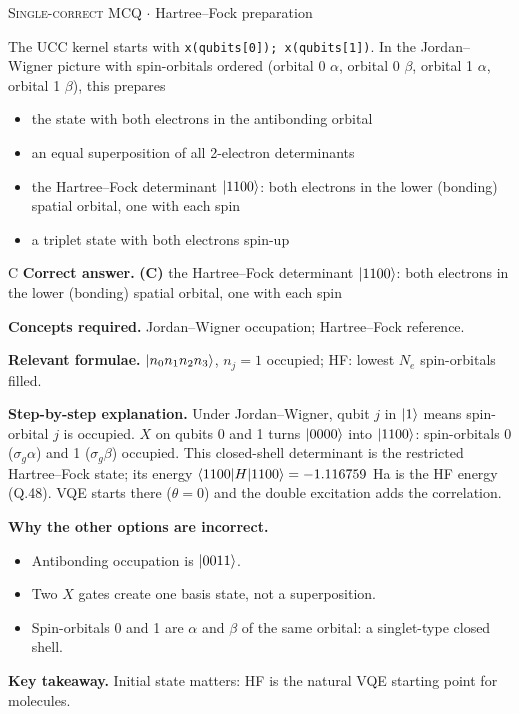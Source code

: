 \documentclass[11pt,a4paper]{article}
\newcommand{\optlabel}[1]{\textbf{(#1)}}
\newcommand{\correctlabel}[1]{\textcolor{okgreen}{\textbf{(#1)}\,\ding{51}}}
\newenvironment{qitem}[1]{\begin{list}{}{\setlength{\leftmargin}{3.3em}\setlength{\labelwidth}{3.1em}%
  \setlength{\labelsep}{0.2em}\setlength{\topsep}{3pt}\setlength{\parsep}{3pt}}\item[\textbf{Q.#1}\hfill]}{\end{list}}
\newcommand{\qsep}{\par\vspace{2pt}{\color{black!15}\hrule}\vspace{4pt}}
\newcommand{\qmeta}[2]{{\footnotesize\color{black!60}\textsc{#1} \;$\cdot$\; #2}\par}
\begin{document}
\begin{qitem}{44}
\qmeta{Single-correct MCQ}{Hartree--Fock preparation}
The UCC kernel starts with \texttt{x(qubits[0]); x(qubits[1])}. In the Jordan--Wigner picture with spin-orbitals ordered (orbital 0 $\alpha$, orbital 0 $\beta$,
orbital 1 $\alpha$, orbital 1 $\beta$), this prepares
\begin{itemize}[leftmargin=2.6em, labelsep=0.4em, itemsep=2pt, topsep=3pt]
\item[\optlabel{A}] the state with both electrons in the antibonding orbital
\item[\optlabel{B}] an equal superposition of all 2-electron determinants
\item[\correctlabel{C}] the Hartree--Fock determinant $\ket{1100}$: both electrons in the lower (bonding) spatial orbital, one with each spin
\item[\optlabel{D}] a triplet state with both electrons spin-up
\end{itemize}
\end{qitem}
\begin{solbox}{C}
\textbf{\color{brand}Correct answer.} \textcolor{okgreen}{\textbf{(C)}} the Hartree--Fock determinant $\ket{1100}$: both electrons in the lower (bonding) spatial orbital, one with each spin

\textbf{\color{brand}Concepts required.} Jordan--Wigner occupation; Hartree--Fock reference.

\textbf{\color{brand}Relevant formulae.} $\ket{n_0n_1n_2n_3}$, $n_j = 1$ occupied; HF: lowest $N_e$ spin-orbitals filled.

\textbf{\color{brand}Step-by-step explanation.} Under Jordan--Wigner, qubit $j$ in $\ket1$ means spin-orbital $j$ is occupied. $X$ on qubits 0 and 1 turns $\ket{0000}$ into $\ket{1100}$: spin-orbitals
0 ($\sigma_g\alpha$) and 1 ($\sigma_g\beta$) occupied. This closed-shell determinant is the restricted Hartree--Fock state; its energy
$\braket{1100|H|1100} = -1.116759$ Ha is the HF energy (Q.48). VQE starts there ($\theta = 0$) and the double excitation adds the correlation.

\textbf{\color{brand}Why the other options are incorrect.}
\begin{itemize}[leftmargin=2.4em, itemsep=1pt, topsep=2pt]
\item[\textbf{(A)}] Antibonding occupation is $\ket{0011}$.
\item[\textbf{(B)}] Two $X$ gates create one basis state, not a superposition.
\item[\textbf{(D)}] Spin-orbitals 0 and 1 are $\alpha$ and $\beta$ of the same orbital: a singlet-type closed shell.
\end{itemize}
\textbf{\color{brand}Key takeaway.} Initial state matters: HF is the natural VQE starting point for molecules.
\end{solbox}
\qsep
\end{document}
